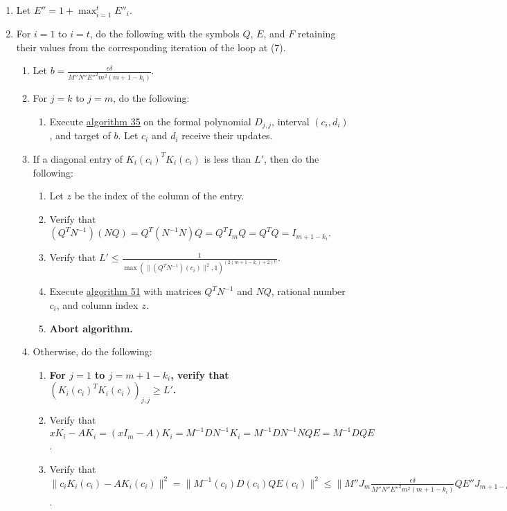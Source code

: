 \documentclass[twocolumn]{article}
\begin{document}
\begin{enumerate}
\begin{enumerate}
					\item Let $E'$ be the matrix obtained by replacing all the negative signs in $E$ with positive signs.
					\item Let $E''_i=\max_{j=1}^m\max_{l=1}^mE'(\max(\lvert c_1\rvert,\lvert d_t\rvert))_{j,l}$.
				\end{enumerate}
				\item Let $E''=1+\max_{i=1}^t E''_i$.
				\item For $i=1$ to $i=t$, do the following with the symbols $Q$, $E$, and $F$ retaining their values from the corresponding iteration of the loop at (7).
				\begin{enumerate}
					\item Let $b=\frac{\epsilon\delta}{M''N''E''^2m^2(m+1-k_i)}$.
					\item For $j=k$ to $j=m$, do the following:
					\begin{enumerate}
						\item Execute \hyperref[sec:algorithm 35]{algorithm 35} on the formal polynomial $D_{j,j}$, interval $(c_i, d_i)$, and target of $b$. Let $c_i$ and $d_i$ receive their updates.
					\end{enumerate}
					\item If a diagonal entry of ${K_i(c_i)}^TK_i(c_i)$ is less than $L'$, then do the following:
					\begin{enumerate}
						\item Let $z$ be the index of the column of the entry.
						\item Verify that $(Q^TN^{-1})(NQ)=Q^T(N^{-1}N)Q=Q^TI_mQ=Q^TQ=I_{m+1-k_i}$.
						\item Verify that $L'\le\frac{1}{\max(\lVert (Q^TN^{-1})(c_i)\rVert^2,1)^{(2(m+1-k_i)+2)!!}}$.
						\item Execute \hyperref[sec:algorithm 51]{algorithm 51} with matrices $Q^TN^{-1}$ and $NQ$, rational number $c_i$, and column index $z$.
						\item \textbf{Abort algorithm.}
					\end{enumerate}
					\item Otherwise, do the following:
					\begin{enumerate}
						\item \textbf{For $j=1$ to $j=m+1-k_i$, verify that $({K_i(c_i)}^TK_i(c_i))_{j,j}\ge L'$.}
						\item Verify that $xK_i-AK_i=(xI_m-A)K_i=M^{-1}DN^{-1}K_i=M^{-1}DN^{-1}NQE=M^{-1}DQE$.
						\item Verify that $\lVert c_iK_i(c_i)-AK_i(c_i)\rVert^2=\lVert M^{-1}(c_i)D(c_i)QE(c_i)\rVert^2\le\lVert M''J_m\frac{\epsilon\delta}{M''N''E''^2m^2(m+1-k_i)}QE''J_{m+1-k}\rVert^2=\lVert J_m\frac{\epsilon\delta}{N''E''m^2(m+1-k_i)}QJ_{m+1-k}\rVert^2=\lVert \frac{\epsilon\delta}{N''E''m^2}J_{m\times (m+1-k_i)}\rVert^2\le\lVert \frac{\epsilon\delta}{N''E''m^2}J_{m\times (m+1-k_i)}\rVert^2=\frac{m+1-k_i}{m^3}\cdot\frac{\epsilon^2\delta^2}{(N''E'')^2}$.

\end{enumerate}
\end{enumerate}
\end{enumerate}
\end{document}
